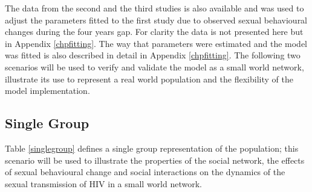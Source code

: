 \newpage
The data from the second and the third studies is also available and was used to adjust
the parameters fitted to the first study due to observed sexual behavioural changes
during the four years gap. For clarity the data is not presented here but in Appendix
\ref{chpfitting}. The way that parameters were estimated and the model was fitted is also
described in detail in Appendix \ref{chpfitting}. The following two scenarios will be
used to verify and validate the model as a small world network, illustrate its use to
represent a real world population and the flexibility of the model implementation.

\subsection{Single Group}\label{scenariosingle}

Table \ref{singlegroup} defines a single group representation of the population; this
scenario will be used to illustrate the properties of the social network, the effects of
sexual behavioural change and social interactions on the dynamics of the sexual
transmission of HIV in a small world network.

